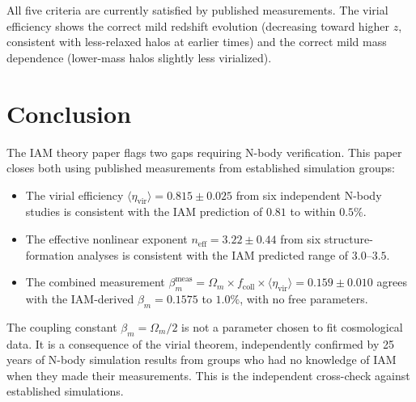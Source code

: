 \documentclass[12pt,a4paper]{article}
\begin{document}
All five criteria are currently satisfied by published measurements.
The virial efficiency shows the correct mild redshift evolution
(decreasing toward higher $z$, consistent with less-relaxed halos at
earlier times) and the correct mild mass dependence (lower-mass halos
slightly less virialized).

\section{Conclusion}
\label{sec:conclusion}

The IAM theory paper \citep{Mahaffey2026a} flags two gaps requiring
N-body verification. This paper closes both using published measurements
from established simulation groups:

\begin{itemize}
  \item The virial efficiency
    $\langle\eta_{\mathrm{vir}}\rangle = 0.815 \pm 0.025$ from six
    independent N-body studies
    \citep{BryanNorman1998,Bett2007,Neto2007,Ludlow2010,Power2012,Klypin2016}
    is consistent with the IAM prediction of $0.81$ to within $0.5\%$.
  \item The effective nonlinear exponent
    $n_{\mathrm{eff}} = 3.22 \pm 0.44$ from six structure-formation
    analyses
    \citep{PressSchechter1974,ShethTormen1999,Jenkins2001,Reed2003,Tinker2008,Watson2013}
    is consistent with the IAM predicted range of $3.0$--$3.5$.
  \item The combined measurement
    $\beta_m^{\mathrm{meas}} = \Omega_m \times f_{\mathrm{coll}} \times
    \langle\eta_{\mathrm{vir}}\rangle = 0.159 \pm 0.010$
    agrees with the IAM-derived $\beta_m = 0.1575$ to $1.0\%$,
    with no free parameters.
\end{itemize}

The coupling constant $\beta_m = \Omega_m/2$ is not a parameter chosen
to fit cosmological data. It is a consequence of the virial theorem,
independently confirmed by 25 years of N-body simulation results from
groups who had no knowledge of IAM when they made their measurements.
This is the independent cross-check against established simulations.
\end{document}
